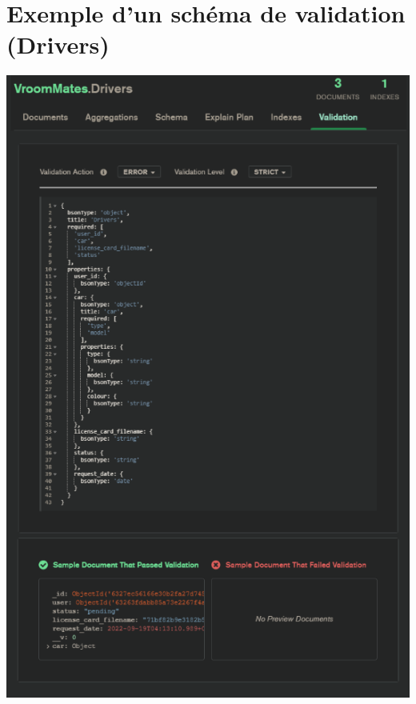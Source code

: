 \section{Exemple d'un schéma de validation (Drivers)}
\label{Exemple d'un schéma de validation (Drivers)}
\begin{center}
\includegraphics[width=\linewidth]{medias/validation.png}
\end{center}

